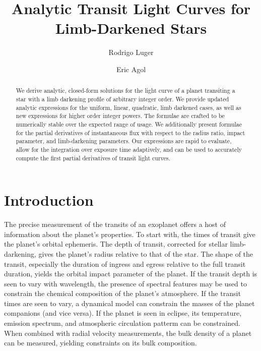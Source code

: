 \documentclass[modern]{aastex61}
\begin{document}

\setlength{\abovedisplayskip}{1.5em}
\setlength{\belowdisplayskip}{1.5em}

\title{%
Analytic Transit Light Curves for Limb-Darkened Stars
}

\author[0000-0002-0296-3826]{Rodrigo Luger}
\author{Eric Agol}


\begin{abstract}
 We derive analytic, closed-form solutions for the light curve of a planet 
 transiting a star with a limb darkening profile of
 arbitrary integer order.  We provide updated analytic expressions for the uniform,
 linear, quadratic, limb darkened cases, as well as new expressions
 for higher order integer powers.  The formulae are crafted to be numerically 
 stable over the expected range of usage.  We additionally present formulae for 
 the partial derivatives of instantaneous flux with respect to the radius ratio, 
 impact parameter, and limb-darkening parameters.  Our expressions are rapid to 
 evaluate, allow for the integration over exposure time adaptively, and
 can be used to accurately compute the first partial derivatives of transit
 light curves.
\end{abstract}

%
\section{Introduction}
\label{sec:intro}

The precise measurement of the transits of an exoplanet offers a host of information
about the planet's properties.  To start with, the times of transit give
the planet's orbital ephemeris.  The depth of transit, corrected for stellar
limb-darkening, gives the planet's radius relative to that of the star.   The
shape of the transit, especially the duration of ingress and egress relative to
the full transit duration, yields the orbital impact parameter of the planet.  
If the transit depth is seen to vary with wavelength, the presence of spectral 
features may be used to constrain the chemical composition of the planet's 
atmosphere.  If the transit times are seen to vary, a dynamical model can constrain 
the masses of the planet companions (and vice versa).  If the planet is seen in 
eclipse, its temperature, emission spectrum, and atmospheric circulation patterm 
can be constrained.  When combined with radial velocity measurements, the bulk 
density of a planet can be measured, yielding constraints on its bulk composition.
\end{document}
